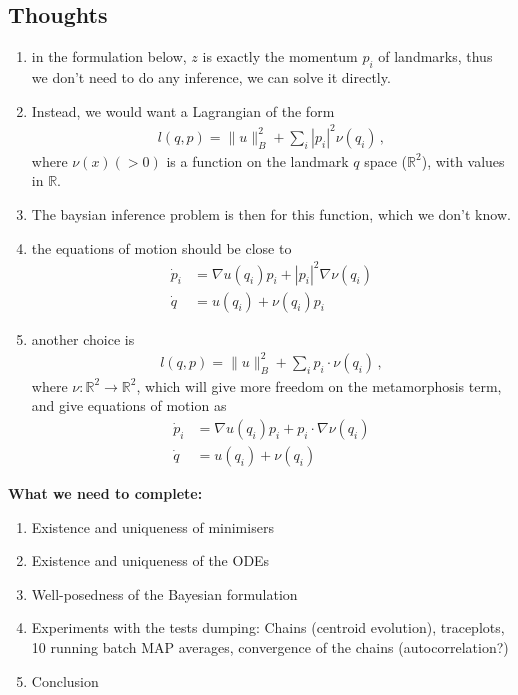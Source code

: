 \documentclass{article}
\begin{document}
\subsection{Thoughts}
\begin{enumerate}
  \item in the formulation below, $z$ is exactly the momentum $p_i$ of landmarks, thus we don't need to do any inference, we can solve it directly. 
  \item Instead, we would want a Lagrangian of the form
    \begin{align}
      l(q,p) = \|u\|_B^2 + \sum_i |p_i|^2 \nu(q_i) \, , 
    \end{align}
    where $\nu(x)(>0)$ is a function on the landmark $q$ space ($\mathbb R^2$), with values in $\mathbb R$. 
  \item The baysian inference problem is then for this function, which we don't know. 
  \item the equations of motion should be close to 
    \begin{align}
      \dot p_i  &= \nabla u(q_i)p_i  + |p_i|^2 \nabla \nu(q_i)\\
      \dot q &= u(q_i) + \nu(q_i) p_i 
    \end{align}
  \item another choice is 
    \begin{align}
      l(q,p) = \|u\|_B^2 + \sum_i p_i\cdot \nu(q_i) \, , 
    \end{align}
    where $\nu:\mathbb R^2 \to \mathbb R^2$, which will give more freedom on the metamorphosis term, and give equations of motion as 
\begin{align}
      \dot p_i  &= \nabla u(q_i)p_i  + p_i \cdot \nabla \nu(q_i)\\
      \dot q &= u(q_i) + \nu(q_i) 
    \end{align}
\end{enumerate}

\textbf{What we need to complete:}

\begin{enumerate}
\item Existence and uniqueness of minimisers
\item Existence and uniqueness of the ODEs
\item Well-posedness of the Bayesian formulation
\item Experiments with the tests dumping: Chains (centroid evolution),
traceplots, 10 running batch MAP averages, convergence of the chains
(autocorrelation?)
\item Conclusion
\end{enumerate}
\end{document}
